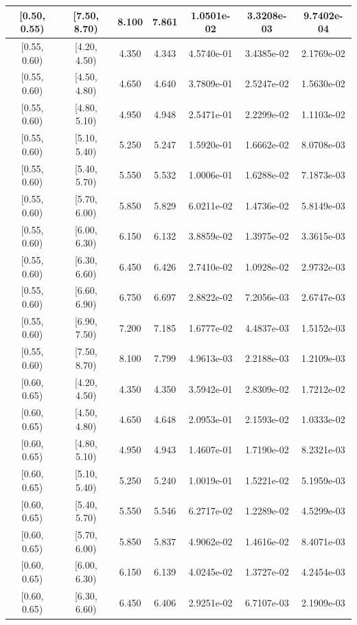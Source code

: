 \begin{longtable}{|c|c|c|c|c|c|c|}
\hline
[0.50, 0.55) & [7.50, 8.70) & 8.100 & 7.861 & 1.0501e-02 & 3.3208e-03 & 9.7402e-04 \\ 
\hline
[0.55, 0.60) & [4.20, 4.50) & 4.350 & 4.343 & 4.5740e-01 & 3.4385e-02 & 2.1769e-02 \\ 
\hline
[0.55, 0.60) & [4.50, 4.80) & 4.650 & 4.640 & 3.7809e-01 & 2.5247e-02 & 1.5630e-02 \\ 
\hline
[0.55, 0.60) & [4.80, 5.10) & 4.950 & 4.948 & 2.5471e-01 & 2.2299e-02 & 1.1103e-02 \\ 
\hline
[0.55, 0.60) & [5.10, 5.40) & 5.250 & 5.247 & 1.5920e-01 & 1.6662e-02 & 8.0708e-03 \\ 
\hline
[0.55, 0.60) & [5.40, 5.70) & 5.550 & 5.532 & 1.0006e-01 & 1.6288e-02 & 7.1873e-03 \\ 
\hline
[0.55, 0.60) & [5.70, 6.00) & 5.850 & 5.829 & 6.0211e-02 & 1.4736e-02 & 5.8149e-03 \\ 
\hline
[0.55, 0.60) & [6.00, 6.30) & 6.150 & 6.132 & 3.8859e-02 & 1.3975e-02 & 3.3615e-03 \\ 
\hline
[0.55, 0.60) & [6.30, 6.60) & 6.450 & 6.426 & 2.7410e-02 & 1.0928e-02 & 2.9732e-03 \\ 
\hline
[0.55, 0.60) & [6.60, 6.90) & 6.750 & 6.697 & 2.8822e-02 & 7.2056e-03 & 2.6747e-03 \\ 
\hline
[0.55, 0.60) & [6.90, 7.50) & 7.200 & 7.185 & 1.6777e-02 & 4.4837e-03 & 1.5152e-03 \\ 
\hline
[0.55, 0.60) & [7.50, 8.70) & 8.100 & 7.799 & 4.9613e-03 & 2.2188e-03 & 1.2109e-03 \\ 
\hline
[0.60, 0.65) & [4.20, 4.50) & 4.350 & 4.350 & 3.5942e-01 & 2.8309e-02 & 1.7212e-02 \\ 
\hline
[0.60, 0.65) & [4.50, 4.80) & 4.650 & 4.648 & 2.0953e-01 & 2.1593e-02 & 1.0333e-02 \\ 
\hline
[0.60, 0.65) & [4.80, 5.10) & 4.950 & 4.943 & 1.4607e-01 & 1.7190e-02 & 8.2321e-03 \\ 
\hline
[0.60, 0.65) & [5.10, 5.40) & 5.250 & 5.240 & 1.0019e-01 & 1.5221e-02 & 5.1959e-03 \\ 
\hline
[0.60, 0.65) & [5.40, 5.70) & 5.550 & 5.546 & 6.2717e-02 & 1.2289e-02 & 4.5299e-03 \\ 
\hline
[0.60, 0.65) & [5.70, 6.00) & 5.850 & 5.837 & 4.9062e-02 & 1.4616e-02 & 8.4071e-03 \\ 
\hline
[0.60, 0.65) & [6.00, 6.30) & 6.150 & 6.139 & 4.0245e-02 & 1.3727e-02 & 4.2454e-03 \\ 
\hline
[0.60, 0.65) & [6.30, 6.60) & 6.450 & 6.406 & 2.9251e-02 & 6.7107e-03 & 2.1909e-03 \\ 

\end{longtable}
